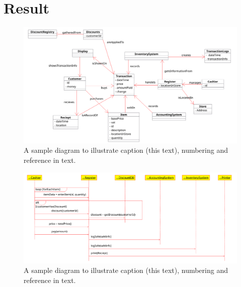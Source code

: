 \documentclass[a4paper]{scrreprt}
\begin{document}
\chapter{Result}
    \label{sec:result}


    \begin{figure}[h!]
        \begin{center}
            \includegraphics[scale=1.0]{dm1.png}
            \caption{A sample diagram to illustrate caption (this text), numbering and reference in text.}
            \label{fig:dm}
        \end{center}
    \end{figure}

    \begin{figure}[h!]
        \begin{center}
            \includegraphics[scale=1.0]{ssd1.png}
            \caption{A sample diagram to illustrate caption (this text), numbering and reference in text.}
            \label{fig:ssd}
        \end{center}
    \end{figure}
\end{document}
